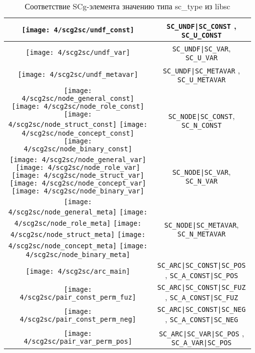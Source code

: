 \begin{table}[ht]
  \caption{Соответствие SCg-элемента значению типа sc\_type из libsc}
  \centering
  \begin{tabular}{|c|c|}
    \hline
	\texttt{[image: 4/scg2sc/undf\_const]} & \verb+SC_UNDF|SC_CONST+
    , \verb+SC_U_CONST+ \\
    
    \hline
    \texttt{[image: 4/scg2sc/undf\_var]} & \verb+SC_UNDF|SC_VAR+, \verb+SC_U_VAR+ \\
    
    \hline
    \texttt{[image: 4/scg2sc/undf\_metavar]} & \verb+SC_UNDF|SC_METAVAR+
    , \verb+SC_U_METAVAR+ \\
    
    \hline
    \texttt{[image: 4/scg2sc/node\_general\_const]}
    \texttt{[image: 4/scg2sc/node\_role\_const]}
    \texttt{[image: 4/scg2sc/node\_struct\_const]}
    \texttt{[image: 4/scg2sc/node\_concept\_const]}
    \texttt{[image: 4/scg2sc/node\_binary\_const]}
    & \verb+SC_NODE|SC_CONST+, \verb+SC_N_CONST+ \\
    
    \hline
    \texttt{[image: 4/scg2sc/node\_general\_var]}
    \texttt{[image: 4/scg2sc/node\_role\_var]}
    \texttt{[image: 4/scg2sc/node\_struct\_var]}
    \texttt{[image: 4/scg2sc/node\_concept\_var]}
    \texttt{[image: 4/scg2sc/node\_binary\_var]}
    & \verb+SC_NODE|SC_VAR+, \verb+SC_N_VAR+ \\
    
    \hline
    \texttt{[image: 4/scg2sc/node\_general\_meta]}
    \texttt{[image: 4/scg2sc/node\_role\_meta]}
    \texttt{[image: 4/scg2sc/node\_struct\_meta]}
    \texttt{[image: 4/scg2sc/node\_concept\_meta]}
    \texttt{[image: 4/scg2sc/node\_binary\_meta]}
    & \verb+SC_NODE|SC_METAVAR+, \verb+SC_N_METAVAR+ \\
    
    \hline
	\texttt{[image: 4/scg2sc/arc\_main]} & \verb+SC_ARC|SC_CONST|SC_POS+
    , \verb+SC_A_CONST|SC_POS+ \\
    
    \hline
	\texttt{[image: 4/scg2sc/pair\_const\_perm\_fuz]} & \verb+SC_ARC|SC_CONST|SC_FUZ+
    , \verb+SC_A_CONST|SC_FUZ+ \\
    
    \hline
	\texttt{[image: 4/scg2sc/pair\_const\_perm\_neg]} & \verb+SC_ARC|SC_CONST|SC_NEG+
    , \verb+SC_A_CONST|SC_NEG+ \\
    
    \hline
	\texttt{[image: 4/scg2sc/pair\_var\_perm\_pos]} & \verb+SC_ARC|SC_VAR|SC_POS+
    , \verb+SC_A_VAR|SC_POS+ \\
    

\end{tabular}
\end{table}
